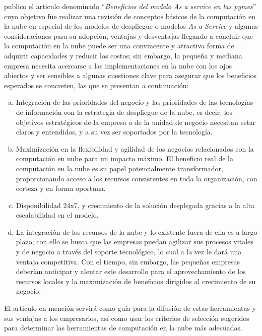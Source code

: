 \cite{jrodriguez} publico el articulo denominado ``\emph{Beneficios del modelo As a
service en las pymes}'' cuyo objetivo fue realizar una revisión de conceptos
básicos de la computación en la nube en especial de los modelos de despliegue
o modelos \emph{As a Service} y algunas consideraciones para su adopción, ventajas
y desventajas llegando a concluir que la computación en la nube puede ser una
convincente y atractiva forma de adquirir capacidades y reducir los costos; sin
embargo, la pequeña y mediana empresa necesita acercarse a las implementaciones
en la nube con los ojos abiertos y ser sensibles a algunas cuestiones clave para
asegurar que los beneficios esperados se concreten, las que se presentan a
continuación:
\begin{enumerate}[a.]
    \item Integración de las prioridades del negocio y las prioridades de las
          tecnologías de información con la estrategia de despliegue de la
          nube, es decir, los objetivos estratégicos de la empresa o de la
          unidad de negocio necesitan estar claros y entendidos, y a su vez ser
          soportados por la tecnología.
    \item Maximización en la flexibilidad y agilidad de los negocios
          relacionados con la computación en nube para un impacto máximo.
          El beneficio real de la computación en la nube es su papel potencialmente
          transformador, proporcionando acceso a los recursos consistentes en
          toda la organización, con certeza y en forma oportuna.
    \item Disponibilidad 24x7, y crecimiento de la solución desplegada gracias
          a la alta escalabilidad en el modelo.
    \item La integración de los recursos de la nube y lo existente fuera de
          ella es a largo plazo; con ello se busca que las empresas puedan agilizar
          sus procesos vitales y de negocio a través del soporte tecnológico,
          lo cual a la vez le dará una ventaja competitiva. Con el tiempo, sin
          embargo, las pequeñas empresas deberían anticipar y alentar este
          desarrollo para el aprovechamiento de los recursos locales y la maximización
          de beneficios dirigidos al crecimiento de su negocio.
\end{enumerate}

El articulo en mención servirá como guía para la difusión de estas herramientas
y sus ventajas a los empresarios, así como usar los criterios de selección
sugeridos para determinar las herramientas de computación en la nube más
adecuadas.

